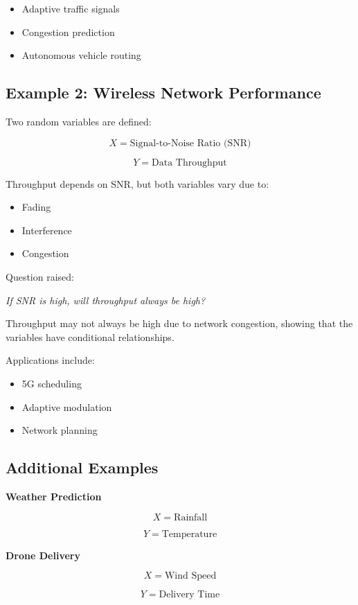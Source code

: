 \documentclass[12pt]{article}
\begin{document}
\begin{itemize}
\item Adaptive traffic signals
\item Congestion prediction
\item Autonomous vehicle routing
\end{itemize}

\subsection*{Example 2: Wireless Network Performance}

Two random variables are defined:

\[
X = \text{Signal-to-Noise Ratio (SNR)}
\]

\[
Y = \text{Data Throughput}
\]

Throughput depends on SNR, but both variables vary due to:

\begin{itemize}
\item Fading
\item Interference
\item Congestion
\end{itemize}

Question raised:

\textit{If SNR is high, will throughput always be high?}

Throughput may not always be high due to network congestion, showing that the variables have conditional relationships.

Applications include:

\begin{itemize}
\item 5G scheduling
\item Adaptive modulation
\item Network planning
\end{itemize}

\subsection*{Additional Examples}

\textbf{Weather Prediction}

\[
X = \text{Rainfall}
\]

\[
Y = \text{Temperature}
\]

\textbf{Drone Delivery}

\[
X = \text{Wind Speed}
\]

\[
Y = \text{Delivery Time}
\]
\end{document}
